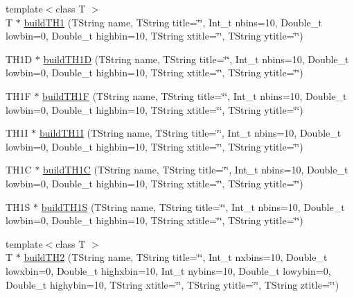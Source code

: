 \begin{DoxyCompactItemize}
\item 
{\footnotesize template$<$class T $>$ }\\T $\ast$ \hyperlink{namespace_h_a_l_afa5eba945570c465a048a363bf4393ae}{build\+T\+H1} (T\+String name, T\+String title=\char`\"{}\char`\"{}, Int\+\_\+t nbins=10, Double\+\_\+t lowbin=0, Double\+\_\+t highbin=10, T\+String xtitle=\char`\"{}\char`\"{}, T\+String ytitle=\char`\"{}\char`\"{})
\item 
T\+H1\+D $\ast$ \hyperlink{namespace_h_a_l_af95b935ec6a0d83d3361e2e6dac98466}{build\+T\+H1\+D} (T\+String name, T\+String title=\char`\"{}\char`\"{}, Int\+\_\+t nbins=10, Double\+\_\+t lowbin=0, Double\+\_\+t highbin=10, T\+String xtitle=\char`\"{}\char`\"{}, T\+String ytitle=\char`\"{}\char`\"{})
\item 
T\+H1\+F $\ast$ \hyperlink{namespace_h_a_l_a4f865f55ea949ac6b2dbd6091976f2ff}{build\+T\+H1\+F} (T\+String name, T\+String title=\char`\"{}\char`\"{}, Int\+\_\+t nbins=10, Double\+\_\+t lowbin=0, Double\+\_\+t highbin=10, T\+String xtitle=\char`\"{}\char`\"{}, T\+String ytitle=\char`\"{}\char`\"{})
\item 
T\+H1\+I $\ast$ \hyperlink{namespace_h_a_l_a696367177984e51ef10f0e764771c443}{build\+T\+H1\+I} (T\+String name, T\+String title=\char`\"{}\char`\"{}, Int\+\_\+t nbins=10, Double\+\_\+t lowbin=0, Double\+\_\+t highbin=10, T\+String xtitle=\char`\"{}\char`\"{}, T\+String ytitle=\char`\"{}\char`\"{})
\item 
T\+H1\+C $\ast$ \hyperlink{namespace_h_a_l_aecb2c6913e187ade28fdd059bb9c0ed1}{build\+T\+H1\+C} (T\+String name, T\+String title=\char`\"{}\char`\"{}, Int\+\_\+t nbins=10, Double\+\_\+t lowbin=0, Double\+\_\+t highbin=10, T\+String xtitle=\char`\"{}\char`\"{}, T\+String ytitle=\char`\"{}\char`\"{})
\item 
T\+H1\+S $\ast$ \hyperlink{namespace_h_a_l_ab6b1c43a147b298e85cb687d847e7773}{build\+T\+H1\+S} (T\+String name, T\+String title=\char`\"{}\char`\"{}, Int\+\_\+t nbins=10, Double\+\_\+t lowbin=0, Double\+\_\+t highbin=10, T\+String xtitle=\char`\"{}\char`\"{}, T\+String ytitle=\char`\"{}\char`\"{})
\item 
{\footnotesize template$<$class T $>$ }\\T $\ast$ \hyperlink{namespace_h_a_l_a60c11c0b80005ea4220a2e4904530f62}{build\+T\+H2} (T\+String name, T\+String title=\char`\"{}\char`\"{}, Int\+\_\+t nxbins=10, Double\+\_\+t lowxbin=0, Double\+\_\+t highxbin=10, Int\+\_\+t nybins=10, Double\+\_\+t lowybin=0, Double\+\_\+t highybin=10, T\+String xtitle=\char`\"{}\char`\"{}, T\+String ytitle=\char`\"{}\char`\"{}, T\+String ztitle=\char`\"{}\char`\"{})

\end{DoxyCompactItemize}
